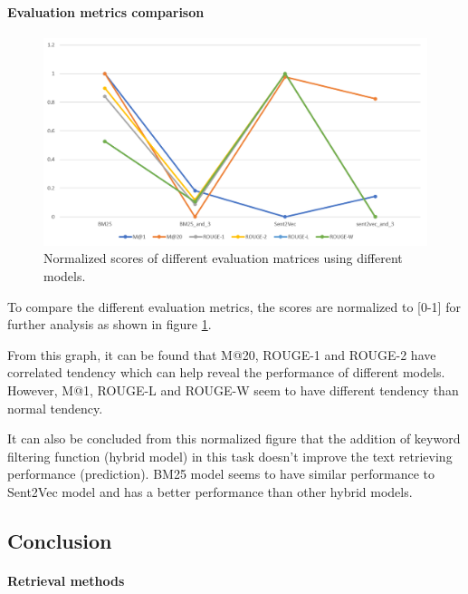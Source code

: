 \documentclass[10pt,a4paper,fleqn]{report}
\begin{document}
				\paragraph{Evaluation metrics comparison}

					\begin{figure}
						\centering
						\includegraphics[width=0.9\linewidth]{figure/partA_normalized_evaluation_metrics}
						\caption{Normalized scores of different evaluation matrices using different models.}
						\label{fig: partanormalizedevaluationmetrics}
					\end{figure}
				
					To compare the different evaluation metrics, the scores are normalized to [0-1] for further analysis as shown in figure \ref{fig: partanormalizedevaluationmetrics}.
					
					From this graph, it can be found that M@20, ROUGE-1 and ROUGE-2 have correlated tendency which can help reveal the performance of different models. However, M@1, ROUGE-L and ROUGE-W seem to have different tendency than normal tendency.
					
					It can also be concluded from this normalized figure that the addition of keyword filtering function (hybrid model) in this task doesn't improve the text retrieving performance (prediction). BM25 model seems to have similar performance to Sent2Vec model and has a better performance than other hybrid models.
					
			
		\subsection{Conclusion}	
			
			\paragraph{Retrieval methods}
			
\end{document}

